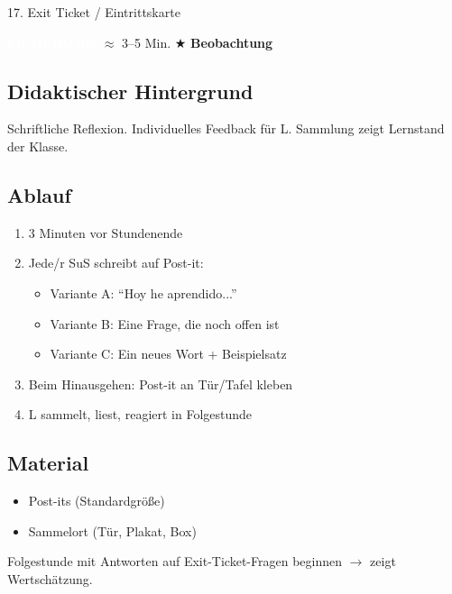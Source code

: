 \documentclass[11pt, a4paper]{article}
\newcommand{\tagSicherung}{\colorbox{sicherung}{\textcolor{white}{\footnotesize\textbf{SICHERUNG}}}}
\newcommand{\zeit}[1]{\textcolor{grau}{\footnotesize $\approx$ #1 Min.}}
\newcommand{\beobachtung}{\textcolor{erfolg}{\footnotesize $\bigstar$ \textbf{Beobachtung}}}
\begin{document}
\begin{methode}{17. Exit Ticket / Eintrittskarte}

\tagSicherung{} \zeit{3--5} \hfill \beobachtung

\subsection*{Didaktischer Hintergrund}
Schriftliche Reflexion. Individuelles Feedback für L. Sammlung zeigt Lernstand der Klasse.

\subsection*{Ablauf}
\begin{enumerate}[leftmargin=*]
    \item 3 Minuten vor Stundenende
    \item Jede/r SuS schreibt auf Post-it:
    \begin{itemize}
        \item Variante A: ``Hoy he aprendido...''
        \item Variante B: Eine Frage, die noch offen ist
        \item Variante C: Ein neues Wort + Beispielsatz
    \end{itemize}
    \item Beim Hinausgehen: Post-it an Tür/Tafel kleben
    \item L sammelt, liest, reagiert in Folgestunde
\end{enumerate}

\subsection*{Material}
\begin{materialbox}
\begin{itemize}[label=$\square$, leftmargin=*]
    \item Post-its (Standardgröße)
    \item Sammelort (Tür, Plakat, Box)
\end{itemize}
\end{materialbox}

\begin{tipp}
Folgestunde mit Antworten auf Exit-Ticket-Fragen beginnen $\rightarrow$ zeigt Wertschätzung.
\end{tipp}

\end{methode}
\end{document}
